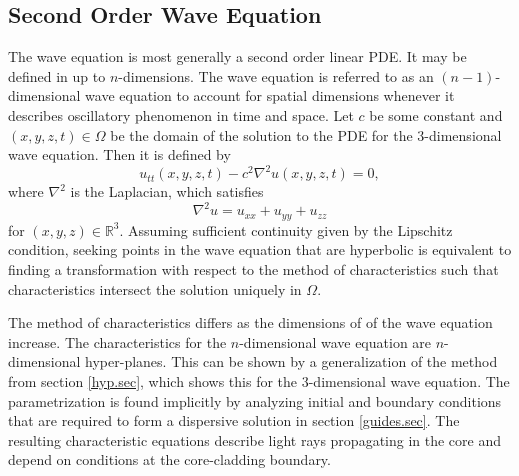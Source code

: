 \documentclass[12pt]{article}
\theoremstyle{definition}
\numberwithin{equation}{section}
\begin{document}
\subsection{Second Order Wave Equation}\label{wave.sec}
The wave equation is most generally a second order linear PDE. It may be defined in up to $n$-dimensions. The wave equation is referred to as an $(n-1)$-dimensional wave equation to account for spatial dimensions whenever it describes oscillatory phenomenon in time and space. Let $c$ be some constant and $(x,y,z,t)\in\Omega$ be the domain of the solution to the PDE for the 3-dimensional wave equation. Then it is defined by
\begin{equation}
u_{tt}(x,y,z,t)-c^2\nabla^2u(x,y,z,t)=0,
\label{order2wave.eqn}
\end{equation}
where $\nabla^2$ is the Laplacian, which satisfies
$$\nabla^2u=u_{xx}+u_{yy}+u_{zz}$$
for $(x,y,z)\in\mathbb{R}^3$. Assuming sufficient continuity given by the Lipschitz condition, seeking points in the wave equation that are hyperbolic is equivalent to finding a transformation with respect to the method of characteristics such that characteristics intersect the solution uniquely in $\Omega$.

The method of characteristics differs as the dimensions of of the wave equation increase. The characteristics for the $n$-dimensional wave equation are $n$-dimensional hyper-planes. This can be shown by a generalization of the method from section \ref{hyp.sec}, which shows this for the $3$-dimensional wave equation. The parametrization is found implicitly by analyzing initial and boundary conditions that are required to form a dispersive solution in section \ref{guides.sec}. The resulting characteristic equations describe light rays propagating in the core and depend on conditions at the core-cladding boundary.
\end{document}
